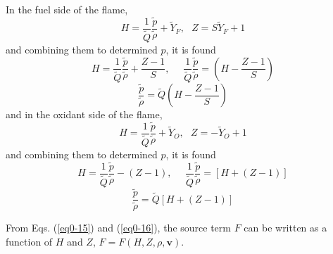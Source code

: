 \documentclass[preprint,12pt,authoryear]{elsarticle}
\begin{document}
{\color{blue}
In the fuel side of the flame, 
\[
     H
     =
     \frac{1}{\tilde{Q}} \frac{\tilde{p}}{\tilde{\rho}} + \tilde{Y}_F
     , \ \ \ 
     Z = S \tilde{Y}_F + 1
\]
and  combining them to determined $p$, it is found
\[
    H = \frac{1}{\tilde{Q}} \frac{\tilde{p}}{\tilde{\rho}}
    + 
    \frac{Z - 1}{S}, 
    \ \ \ \ \ \ 
    \frac{1}{\tilde{Q}} \frac{\tilde{p}}{\tilde{\rho}}
    =
    \left( H - \frac{Z-1}{S} \right)
\]
\begin{equation}
    \frac{\tilde{p}}{\tilde{\rho}}
    =
    \tilde{Q}
    \left( H - \frac{Z-1}{S} \right)
\label{eq0-15}
\end{equation}
and  in the oxidant side of the flame,
\[
     H
     =
     \frac{1}{\tilde{Q}} \frac{\tilde{p}}{\tilde{\rho}} + \tilde{Y}_O
     , \ \ \ 
     Z = - \tilde{Y}_O + 1
\]
and  combining them to determined $p$, it is found
\[
    H = \frac{1}{\tilde{Q}} \frac{\tilde{p}}{\tilde{\rho}}
    -
    (Z - 1), 
    \ \ \ \ \ \ 
    \frac{1}{\tilde{Q}} \frac{\tilde{p}}{\tilde{\rho}}
    =
    \left[ H + (Z-1) \right]
\]
\begin{equation}
    \frac{\tilde{p}}{\tilde{\rho}}
    =
    \tilde{Q}
    \left[ H + (Z-1) \right]
\label{eq0-16}
\end{equation}









From Eqs. (\ref{eq0-15}) and (\ref{eq0-16}), the source term $F$ can be written as a function of $H$ and $Z$, $F = F(H, Z, \rho, \mathbf{v}) $.

}
\end{document}

